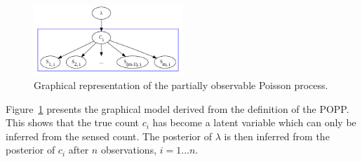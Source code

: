 \begin{figure}[t!]
	\centering
%    	
    	
    \includegraphics[width=0.5\textwidth]{./figures/gm_popp.png}
	\caption{Graphical representation of the partially observable Poisson process.}
	\label{fig:gm_popp}
\end{figure}
Figure~\ref{fig:gm_popp} presents the graphical model derived from the definition of the POPP. This shows that the true count $c_i$ has become a latent variable which can only be inferred from the sensed count.
% 
The posterior of $\lambda$ is then inferred from the posterior of $c_i$ after $n$ observations, $i = 1 \ldots n$. 

